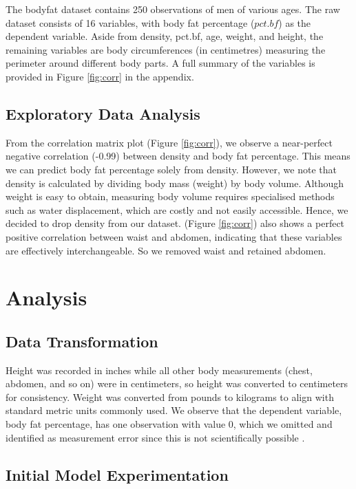 \documentclass[letterpaper,9pt,twocolumn,twoside,]{pinp}
\begin{document}
The bodyfat dataset contains 250 observations of men of various ages.
The raw dataset consists of 16 variables, with body fat percentage
(\(pct.bf\)) as the dependent variable. Aside from density, pct.bf, age,
weight, and height, the remaining variables are body circumferences (in
centimetres) measuring the perimeter around different body parts. A full
summary of the variables is provided in Figure \ref{fig:corr} in the
appendix.

\subsection{Exploratory Data Analysis}\label{exploratory-data-analysis}

From the correlation matrix plot (Figure \ref{fig:corr}), we observe a
near-perfect negative correlation (-0.99) between density and body fat
percentage. This means we can predict body fat percentage solely from
density. However, we note that density is calculated by dividing body
mass (weight) by body volume. Although weight is easy to obtain,
measuring body volume requires specialised methods such as water
displacement, which are costly and not easily accessible. Hence, we
decided to drop density from our dataset. (Figure \ref{fig:corr}) also
shows a perfect positive correlation between waist and abdomen,
indicating that these variables are effectively interchangeable. So we
removed waist and retained abdomen.

\section{Analysis}\label{analysis}

\subsection{Data Transformation}\label{data-transformation}

Height was recorded in inches while all other body measurements (chest,
abdomen, and so on) were in centimeters, so height was converted to
centimeters for consistency. Weight was converted from pounds to
kilograms to align with standard metric units commonly used. We observe
that the dependent variable, body fat percentage, has one observation
with value 0, which we omitted and identified as measurement error since
this is not scientifically possible \citep{menshealth2020}.

\subsection{Initial Model
Experimentation}\label{initial-model-experimentation}
\end{document}
